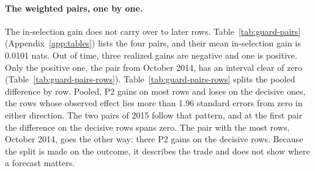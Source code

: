 \paragraph{The weighted pairs, one by one.}
The in-selection gain does not carry over to later rows. Table~\ref{tab:guard-pairs} (Appendix~\ref{app:tables}) lists the four pairs, and their mean in-selection gain is 0.0101 nats. Out of time, three realized gains are negative and one is positive. Only the positive one, the pair from October 2014, has an interval clear of zero (Table~\ref{tab:guard-pairs-rows}).
Table~\ref{tab:guard-pairs-rows} splits the pooled difference by row. Pooled, P2 gains on most rows and loses on the decisive ones, the rows whose observed effect lies more than 1.96 standard errors from zero in either direction. The two pairs of 2015 follow that pattern, and at the first pair the difference on the decisive rows spans zero. The pair with the most rows, October 2014, goes the other way: there P2 gains on the decisive rows. Because the split is made on the outcome, it describes the trade and does not show where a forecast matters.

